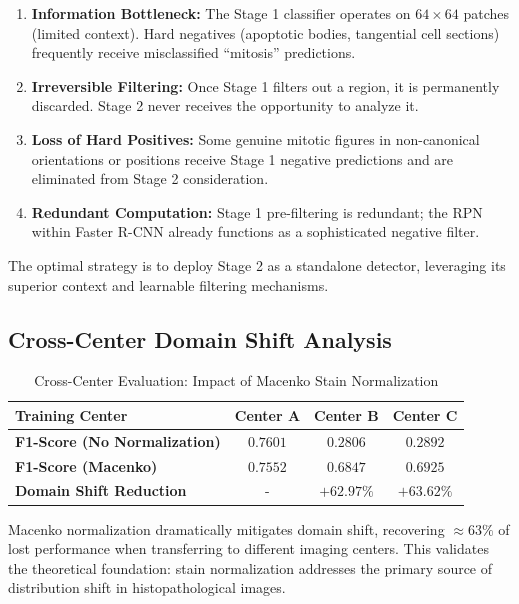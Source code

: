 \documentclass[journal]{IEEEtran}
\begin{document}
\begin{enumerate}
\item \textbf{Information Bottleneck:} The Stage 1 classifier operates on $64 \times 64$ patches (limited context). Hard negatives (apoptotic bodies, tangential cell sections) frequently receive misclassified ``mitosis'' predictions.
\item \textbf{Irreversible Filtering:} Once Stage 1 filters out a region, it is permanently discarded. Stage 2 never receives the opportunity to analyze it.
\item \textbf{Loss of Hard Positives:} Some genuine mitotic figures in non-canonical orientations or positions receive Stage 1 negative predictions and are eliminated from Stage 2 consideration.
\item \textbf{Redundant Computation:} Stage 1 pre-filtering is redundant; the RPN within Faster R-CNN already functions as a sophisticated negative filter.
\end{enumerate}

The optimal strategy is to deploy Stage 2 as a standalone detector, leveraging its superior context and learnable filtering mechanisms.

\subsection{Cross-Center Domain Shift Analysis}
\begin{table}[!h]
\centering
\begin{tabular}{|l|c|c|c|}
\hline
\textbf{Training Center} & \textbf{Center A} & \textbf{Center B} & \textbf{Center C} \\
\hline
\textbf{F1-Score (No Normalization)} & $0.7601$ & $0.2806$ & $0.2892$ \\
\textbf{F1-Score (Macenko)} & $0.7552$ & $0.6847$ & $0.6925$ \\
\textbf{Domain Shift Reduction} & - & $\mathbf{+62.97\%}$ & $\mathbf{+63.62\%}$ \\
\hline
\end{tabular}
\caption{Cross-Center Evaluation: Impact of Macenko Stain Normalization}
\label{table:domain_shift}
\end{table}

Macenko normalization dramatically mitigates domain shift, recovering $\approx 63\%$ of lost performance when transferring to different imaging centers. This validates the theoretical foundation: stain normalization addresses the primary source of distribution shift in histopathological images.
\end{document}
